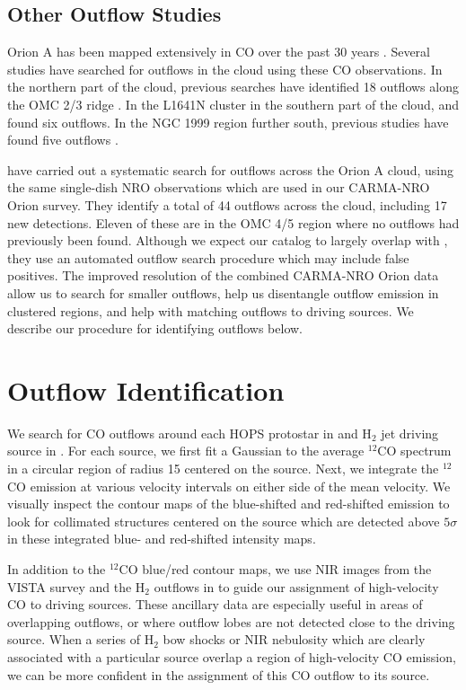 \documentclass[twocolumn]{aastex63}
\newcommand{\co}[1][]{\ensuremath{^{#1}}CO}
\begin{document}
\subsection{Other Outflow Studies}
Orion A has been mapped extensively in CO over the past 30 years \citep[e.g.][]{Bally87,Wilson05,Shimajiri11,Buckle12,Ripple13,Berne14}. Several studies have searched for outflows in the cloud using these CO observations. In the northern part of the cloud, previous searches have identified 18 outflows along the OMC 2/3 ridge \citep{Chini97,Aso00,Williams03,Takahashi08,Shimajiri08,Shimajiri09}. In the L1641N cluster in the southern part of the cloud, \citet{Stanke07} and \citet{Nakamura12} found six outflows. In the NGC 1999 region further south, previous studies have found five outflows \citep{Morgan91,Moro-Martin99,Davis2000,Choi17}. 

\citet{Tanabe19} have carried out a systematic search for outflows across the Orion A cloud, using the same single-dish NRO observations which are used in our CARMA-NRO Orion survey. They identify a total of 44 outflows across the cloud, including 17 new detections. Eleven of these are in the OMC 4/5 region where no outflows had previously been found. Although we expect our catalog to largely overlap with \citet{Tanabe19}, they use an automated outflow search procedure which may include false positives. The improved resolution of the combined CARMA-NRO Orion data allow us to search for smaller outflows, help us disentangle outflow emission in clustered regions, and help with matching outflows to driving sources. We describe our procedure for identifying outflows below.

\section{Outflow Identification}
\label{sec:identification}
We search for CO outflows around each HOPS protostar in \citet{Furlan16} and H$_2$ jet driving source in \citet{Davis09}. For each source, we first fit a Gaussian to the average \co[12] spectrum in a circular region of radius 15\arcsec{} centered on the source. Next, we integrate the \co[12] emission at various velocity intervals on either side of the mean velocity. We visually inspect the contour maps of the blue-shifted and red-shifted emission to look for collimated structures centered on the source which are detected above $5\sigma$ in these integrated blue- and red-shifted intensity maps.

In addition to the \co[12]{} blue/red contour maps, we use NIR images from the VISTA survey \citep{Meingast16} and the H$_2$ outflows in \citet{Davis09} to guide our assignment of high-velocity CO to driving sources. These ancillary data are especially useful in areas of overlapping outflows, or where outflow lobes are not detected close to the driving source. When a series of H$_2$ bow shocks or NIR nebulosity which are clearly associated with a particular source overlap a region of high-velocity CO emission, we can be more confident in the assignment of this CO outflow to its source.
\end{document}
